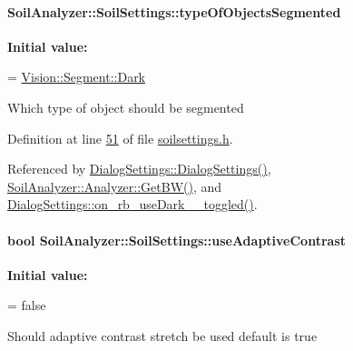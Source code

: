\hypertarget{class_soil_analyzer_1_1_soil_settings_a21ae88dba6b9b0b07d9c26812bc739fb}{}
\paragraph[{type\+Of\+Objects\+Segmented}]{ Soil\+Analyzer\+::\+Soil\+Settings\+::type\+Of\+Objects\+Segmented}\label{class_soil_analyzer_1_1_soil_settings_a21ae88dba6b9b0b07d9c26812bc739fb}
{\bfseries Initial value\+:}
\begin{DoxyCode}
=
      \hyperlink{class_vision_1_1_segment_ac3ddf2c72ee6333007510b680db1e7dda962a0c0955809f63df036dbd41824c54}{Vision::Segment::Dark}
\end{DoxyCode}
Which type of object should be segmented 

Definition at line \hyperlink{soilsettings_8h_source_l00051}{51} of file \hyperlink{soilsettings_8h_source}{soilsettings.\+h}.



Referenced by \hyperlink{dialogsettings_8cpp_source_l00005}{Dialog\+Settings\+::\+Dialog\+Settings()}, \hyperlink{analyzer_8cpp_source_l00236}{Soil\+Analyzer\+::\+Analyzer\+::\+Get\+B\+W()}, and \hyperlink{dialogsettings_8cpp_source_l00381}{Dialog\+Settings\+::on\+\_\+rb\+\_\+use\+Dark\+\_\+\_\+toggled()}.

\hypertarget{class_soil_analyzer_1_1_soil_settings_a0e27335d05aed8f3f084744062368578}{}
\paragraph[{use\+Adaptive\+Contrast}]{\setlength{\rightskip}{0pt plus 5cm}bool Soil\+Analyzer\+::\+Soil\+Settings\+::use\+Adaptive\+Contrast}\label{class_soil_analyzer_1_1_soil_settings_a0e27335d05aed8f3f084744062368578}
{\bfseries Initial value\+:}
\begin{DoxyCode}
=
      \textcolor{keyword}{false}
\end{DoxyCode}
Should adaptive contrast stretch be used default is true 

